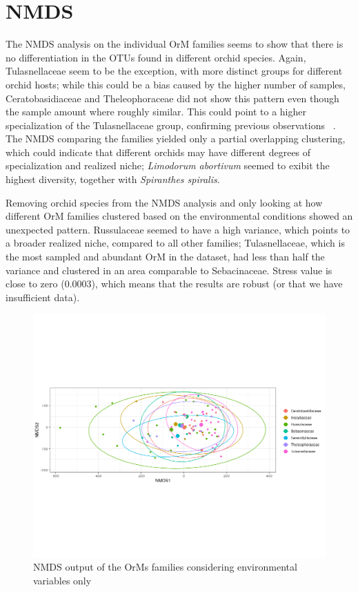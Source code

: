 \chapter{NMDS}
\label{nmds}

The NMDS analysis on the individual OrM families seems to show that there is no differentiation in the OTUs found in different orchid species.
Again, Tulasnellaceae seem to be the exception, with more distinct groups for different orchid hosts; while this could be a bias caused by the higher number of samples, Ceratobasidiaceae and Theleophoraceae did not show this pattern even though the sample amount where roughly similar. This could point to a higher specialization of the Tulasnellaceae group, confirming previous observations ~\citep{dearnaley2007}.
The NMDS comparing the families yielded only a partial overlapping clustering, which could indicate that different orchids may have different degrees of specialization and realized niche; \emph{Limodorum abortivum} seemed to exibit the highest diversity, together with \emph{Spiranthes spiralis}.

Removing orchid species from the NMDS analysis and only looking at how different OrM families clustered based on the environmental conditions showed an unexpected pattern. Russulaceae seemed to have a high variance, which points to a broader realized niche, compared to all other families; Tulasnellaceae, which is the most sampled and abundant OrM in the dataset, had less than half the variance and clustered in an area comparable to Sebacinaceae. Stress value is close to zero (0.0003), which means that the results are robust (or that we have insufficient data).

\begin{figure}[htbp]
\centering
\includegraphics[keepaspectratio,width=\textwidth,height=0.75\textheight]{images/nmdsEnvMatrix.png}
\caption{NMDS output of the OrMs families considering environmental variables only}
\end{figure}

